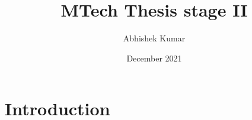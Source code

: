 \documentclass{article}
\title{MTech Thesis  stage II}
\author{Abhishek Kumar }
\date{December 2021}
\begin{document}
\maketitle

\section{Introduction}
\end{document}
